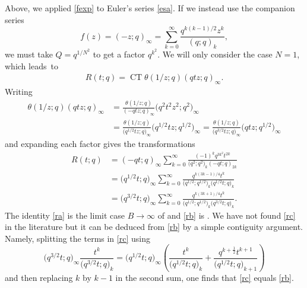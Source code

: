\documentclass[pdftex]{sigma}
\numberwithin{equation}{section}
\newcommand{\ct}{\operatorname{CT}}
\begin{document}
Above, we applied \eqref{fexp} to Euler's series \eqref{esa}. If we instead use the companion series
\[
 f(z)=(-z;q)_\infty=\sum_{k=0}^\infty\frac{q^{k(k-1)/2}z^k}{(q;q)_k},
 \]
we must take $Q=q^{1/N^2}$ to get a factor $q^{k^2}$. We will only consider the case $N=1$, which leads~to
\begin{gather}\label{rct}R(t;q)=\ct \theta(1/z;q) (qtz;q)_\infty.\end{gather}
Writing
\begin{align*}
\theta(1/z;q)(qtz;q)_\infty&=\frac{\theta(1/z;q)}{(-qtz;q)_\infty }\bigl(q^2t^2z^2;q^2\bigr)_\infty\\
&
= \frac{\theta(1/z;q)}{\bigl(q^{1/2}tz;q\bigr)_\infty}\bigl(q^{1/2}tz;q^{1/2}\bigr)_\infty=\frac{\theta(1/z;q)}{\bigl(q^{3/2}tz;q\bigr)_\infty}\bigl(qtz;q^{1/2}\bigr)_\infty \end{align*}
and expanding each factor gives the transformations
\begin{subequations}\label{rx}
\begin{align}
\label{ra}R(t;q)&=(-qt;q)_\infty\sum_{k=0}^\infty\frac{(-1)^kq^{3k^2}t^{2k}}{\bigl(q^2;q^2\bigr)_k(-qt;q)_{2k}}\\
\label{rb}&=\bigl(q^{1/2}t;q\bigr)_\infty\sum_{k=0}^\infty\frac{q^{k(3k-1)/4}t^k}{\bigl(q^{1/2};q^{1/2}\bigr)_k\bigl(q^{1/2}t;q\bigr)_k}\\
\label{rc}&=\bigl(q^{3/2}t;q\bigr)_\infty\sum_{k=0}^\infty\frac{q^{k(3k+1)/4}t^k}{\bigl(q^{1/2};q^{1/2}\bigr)_k\bigl(q^{3/2}t;q\bigr)_k}.
\end{align}
\end{subequations}
The identity \eqref{ra} is the limit case $B\rightarrow\infty$ of \cite[equation~(7.9)]{gs} and \eqref{rb} is
\cite[equation~(7.17)]{gs}. We have not found \eqref{rc} in the literature but it can be deduced from \eqref{rb} by a simple contiguity argument.
Namely, splitting the terms in \eqref{rc} using
\begin{equation*}
\bigl(q^{3/2}t;q\bigr)_\infty\frac{t^k}{\bigl(q^{3/2}t;q\bigr)_k}= \bigl(q^{1/2}t;q\bigr)_\infty\left(\frac{t^k}{\bigl(q^{1/2}t;q\bigr)_k}+\frac{q^{k+\frac 12}t^{k+1}}{\bigl(q^{1/2}t;q\bigr)_{k+1}}\right)
\end{equation*}
 and then replacing $k$ by $k-1$ in the second sum, one finds that \eqref{rc} equals \eqref{rb}.
\end{document}
